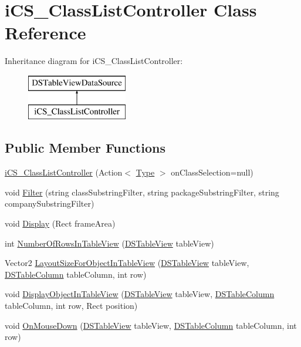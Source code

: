 \hypertarget{classi_c_s___class_list_controller}{\section{i\+C\+S\+\_\+\+Class\+List\+Controller Class Reference}
\label{classi_c_s___class_list_controller}
}
Inheritance diagram for i\+C\+S\+\_\+\+Class\+List\+Controller\+:\begin{figure}[H]
\begin{center}
\leavevmode
\includegraphics[height=2.000000cm]{classi_c_s___class_list_controller}
\end{center}
\end{figure}
\subsection*{Public Member Functions}
\begin{DoxyCompactItemize}
\item 
\hyperlink{classi_c_s___class_list_controller_acbfa4678b3160e5145eed91562eb729b}{i\+C\+S\+\_\+\+Class\+List\+Controller} (Action$<$ \hyperlink{i_c_s___object_type_enum_8cs_ae6c3dd6d8597380b56d94908eb431547aa1fa27779242b4902f7ae3bdd5c6d508}{Type} $>$ on\+Class\+Selection=null)
\item 
void \hyperlink{classi_c_s___class_list_controller_a2a18384dbf4a6c100805cc51db9db5a9}{Filter} (string class\+Substring\+Filter, string package\+Substring\+Filter, string company\+Substring\+Filter)
\item 
void \hyperlink{classi_c_s___class_list_controller_ad7bd124281e42e9c3fb26cf0e6b439b5}{Display} (Rect frame\+Area)
\item 
int \hyperlink{classi_c_s___class_list_controller_ad95671e202922a9dd334a7a02a0987e8}{Number\+Of\+Rows\+In\+Table\+View} (\hyperlink{class_d_s_table_view}{D\+S\+Table\+View} table\+View)
\item 
Vector2 \hyperlink{classi_c_s___class_list_controller_aadb72621c81b24832c11ffa9f303476f}{Layout\+Size\+For\+Object\+In\+Table\+View} (\hyperlink{class_d_s_table_view}{D\+S\+Table\+View} table\+View, \hyperlink{class_d_s_table_column}{D\+S\+Table\+Column} table\+Column, int row)
\item 
void \hyperlink{classi_c_s___class_list_controller_ac874bb1c74dda599ee99a823a849fa89}{Display\+Object\+In\+Table\+View} (\hyperlink{class_d_s_table_view}{D\+S\+Table\+View} table\+View, \hyperlink{class_d_s_table_column}{D\+S\+Table\+Column} table\+Column, int row, Rect position)
\item 
void \hyperlink{classi_c_s___class_list_controller_a904383e4bd722a62dafa59f88487e129}{On\+Mouse\+Down} (\hyperlink{class_d_s_table_view}{D\+S\+Table\+View} table\+View, \hyperlink{class_d_s_table_column}{D\+S\+Table\+Column} table\+Column, int row)
\end{DoxyCompactItemize}
